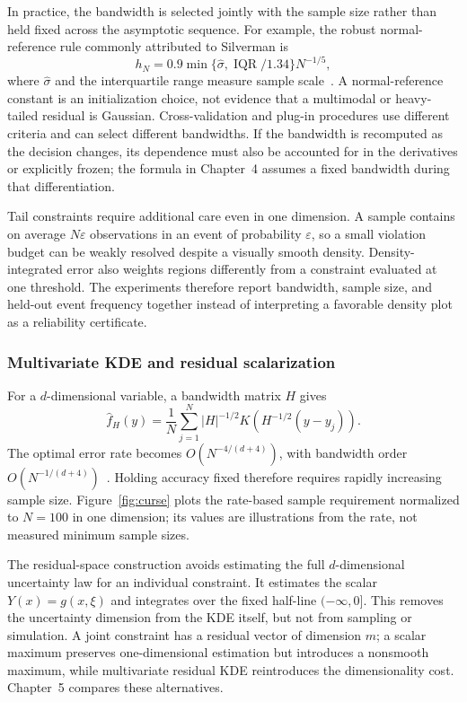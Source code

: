 In practice, the bandwidth is selected jointly with the sample size rather than held fixed across the asymptotic sequence. For example, the robust normal-reference rule commonly attributed to Silverman is
\begin{equation}
 h_N=0.9\min\{\hat\sigma,\operatorname{IQR}/1.34\}N^{-1/5},
 \label{eq:ch3-bandwidth-rule}
\end{equation}
where $\hat\sigma$ and the interquartile range measure sample scale~\citep{silverman1986}. A normal-reference constant is an initialization choice, not evidence that a multimodal or heavy-tailed residual is Gaussian. Cross-validation and plug-in procedures use different criteria and can select different bandwidths. If the bandwidth is recomputed as the decision changes, its dependence must also be accounted for in the derivatives or explicitly frozen; the formula in Chapter~4 assumes a fixed bandwidth during that differentiation.

Tail constraints require additional care even in one dimension. A sample contains on average $N\varepsilon$ observations in an event of probability $\varepsilon$, so a small violation budget can be weakly resolved despite a visually smooth density. Density-integrated error also weights regions differently from a constraint evaluated at one threshold. The experiments therefore report bandwidth, sample size, and held-out event frequency together instead of interpreting a favorable density plot as a reliability certificate.

\subsubsection{Multivariate KDE and residual scalarization}
\label{ssec:curse}

For a $d$-dimensional variable, a bandwidth matrix $H$ gives
\begin{equation*}
  \hat f_H(y)=\frac{1}{N}\sum_{j=1}^N |H|^{-1/2} K\!\left(H^{-1/2}(y-y_j)\right).
\end{equation*}
The optimal error rate becomes $O(N^{-4/(d+4)})$, with bandwidth order $O(N^{-1/(d+4)})$~\citep{silverman1986,scott1992}. Holding accuracy fixed therefore requires rapidly increasing sample size. Figure~\ref{fig:curse} plots the rate-based sample requirement normalized to $N=100$ in one dimension; its values are illustrations from the rate, not measured minimum sample sizes.

The residual-space construction avoids estimating the full $d$-dimensional uncertainty law for an individual constraint. It estimates the scalar $Y(x)=g(x,\xi)$ and integrates over the fixed half-line $(-\infty,0]$. This removes the uncertainty dimension from the KDE itself, but not from sampling or simulation. A joint constraint has a residual vector of dimension $m$; a scalar maximum preserves one-dimensional estimation but introduces a nonsmooth maximum, while multivariate residual KDE reintroduces the dimensionality cost. Chapter~5 compares these alternatives.

